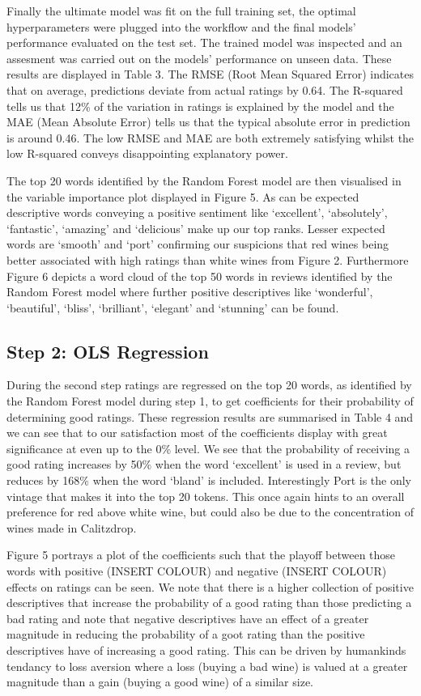 \documentclass[11pt,preprint]{elsarticle}
\numberwithin{equation}{section}
\numberwithin{figure}{section}
\numberwithin{table}{section}
\begin{document}
Finally the ultimate model was fit on the full training set, the optimal
hyperparameters were plugged into the workflow and the final models'
performance evaluated on the test set. The trained model was inspected
and an assesment was carried out on the models' performance on unseen
data. These results are displayed in Table 3. The RMSE (Root Mean
Squared Error) indicates that on average, predictions deviate from
actual ratings by 0.64. The R-squared tells us that 12\% of the
variation in ratings is explained by the model and the MAE (Mean
Absolute Error) tells us that the typical absolute error in prediction
is around 0.46. The low RMSE and MAE are both extremely satisfying
whilst the low R-squared conveys disappointing explanatory power.

The top 20 words identified by the Random Forest model are then
visualised in the variable importance plot displayed in Figure 5. As can
be expected descriptive words conveying a positive sentiment like
`excellent', `absolutely', `fantastic', `amazing' and `delicious' make
up our top ranks. Lesser expected words are `smooth' and `port'
confirming our suspicions that red wines being better associated with
high ratings than white wines from Figure 2. Furthermore Figure 6
depicts a word cloud of the top 50 words in reviews identified by the
Random Forest model where further positive descriptives like
`wonderful', `beautiful', `bliss', `brilliant', `elegant' and `stunning'
can be found.

\subsection{Step 2: OLS Regression}\label{step-2-ols-regression}

During the second step ratings are regressed on the top 20 words, as
identified by the Random Forest model during step 1, to get coefficients
for their probability of determining good ratings. These regression
results are summarised in Table 4 and we can see that to our
satisfaction most of the coefficients display with great significance at
even up to the 0\% level. We see that the probability of receiving a
good rating increases by 50\% when the word `excellent' is used in a
review, but reduces by 168\% when the word `bland' is included.
Interestingly Port is the only vintage that makes it into the top 20
tokens. This once again hints to an overall preference for red above
white wine, but could also be due to the concentration of wines made in
Calitzdrop.

Figure 5 portrays a plot of the coefficients such that the playoff
between those words with positive (INSERT COLOUR) and negative (INSERT
COLOUR) effects on ratings can be seen. We note that there is a higher
collection of positive descriptives that increase the probability of a
good rating than those predicting a bad rating and note that negative
descriptives have an effect of a greater magnitude in reducing the
probability of a goot rating than the positive descriptives have of
increasing a good rating. This can be driven by humankinds tendancy to
loss aversion where a loss (buying a bad wine) is valued at a greater
magnitude than a gain (buying a good wine) of a similar size.
\end{document}
